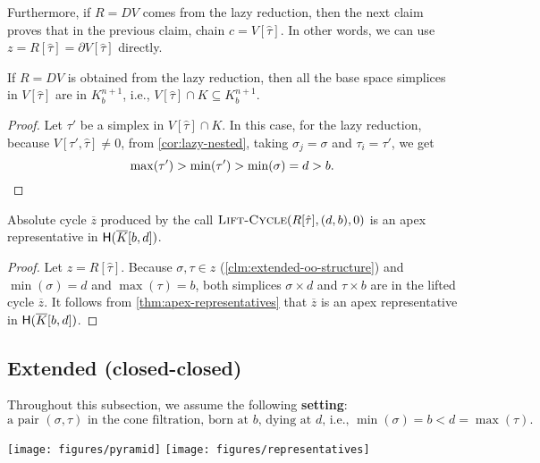 \documentclass[cleveref,a4paper,english,nolineno]{socg-lipics-v2021}
\newcommand{\Hgr}{{\sf H}}
\newcommand{\prism}[1]{\overline{#1}}
\newcommand{\cone}[1]{\hat{#1}}
\newcommand{\bdry}{\partial}
\newcommand{\pK}{\prism{K}}
\newcommand{\pz}{\prism{z}}
\newcommand{\supK}[1]{K_{#1}^{n+1}}
\newcommand{\ssx}{\sigma}
\newcommand{\tsx}{\tau}
\newcommand{\ctsx}{\cone{\tsx}}
\newcommand{\algname}[1]{\textsc{#1}}
\begin{document}
    \begin{remark}
        Furthermore, if $R = DV$ comes from the lazy reduction, then the next claim proves that
        in the previous claim, chain $c = V[\ctsx]$.
        In other words, we can use $z = R[\ctsx] = \bdry V[\ctsx]$ directly.
    \end{remark}

    \begin{claim}
        \label{clm:lazy-V-sup}
        If $R=DV$ is obtained from the lazy reduction, then all the base space
        simplices in $V[\ctsx]$ are in $\supK{b}$, i.e., $V[\ctsx] \cap K \subseteq \supK{b}$.
    \end{claim}
    \begin{proof}
                Let $\tsx'$ be a simplex in $V[\ctsx] \cap K$. In this case,
                for the lazy reduction, because $V[\tsx', \ctsx] \neq 0$, from
                \cref{cor:lazy-nested}, taking
                $\ssx_j = \ssx$ and $\tsx_i = \tsx'$, we get
                \[
                    \max(\tsx') > \min(\tsx') > \min(\ssx) = d > b.
                    \qedhere
                \]
    \end{proof}

\begin{claim}%
    \label{clm:extended-oo-correct}
    Absolute cycle $\pz$ produced by the call $\algname{Lift-Cycle}(R[\ctsx], (d,b), 0)$
    is an apex representative in $\Hgr(\pK[b,d])$.
\end{claim}
\begin{proof}
    Let $z = R[\ctsx]$.
    Because $\ssx, \tsx \in z$ (\cref{clm:extended-oo-structure}) and
    $\min(\ssx) = d$ and $\max(\tsx) = b$,
    both simplices $\ssx \times d$ and $\tsx \times b$ are in the lifted cycle $\pz$.
    It follows from \cref{thm:apex-representatives} that $\pz$ is an apex
    representative in $\Hgr(\pK[b,d])$.
\end{proof}


\subsection{Extended (closed-closed)}
\label{sec:extended-cc}

Throughout this subsection, we assume the following \textbf{setting}:
\[
    \text{a pair $(\ssx,\ctsx)$ in the cone filtration, born at $b$, dying at $d$, i.e.,
    $\min(\ssx) = b < d = \max(\tsx)$.}
\]

    \texttt{[image: figures/pyramid]}
        \quad
    \texttt{[image: figures/representatives]}
\end{document}
